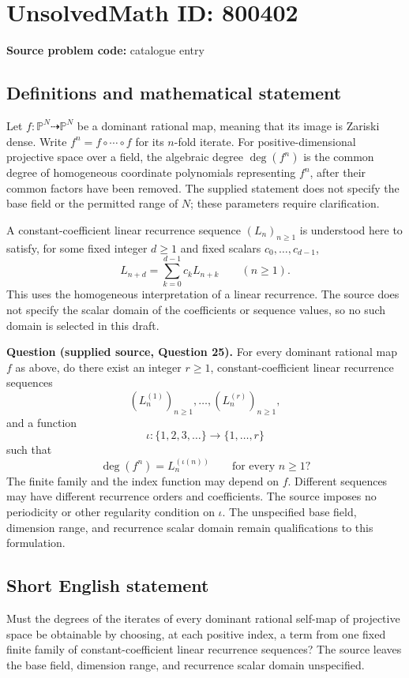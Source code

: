 \documentclass[11pt]{article}
\begin{document}
\section*{UnsolvedMath ID: 800402}
\textbf{Source problem code:} catalogue entry
\subsection{Definitions and mathematical statement}
Let \(f:\mathbb{P}^{N}\dashrightarrow\mathbb{P}^{N}\) be a dominant rational map, meaning that its image is Zariski dense. Write \(f^{n}=f\circ\cdots\circ f\) for its \(n\)-fold iterate. For positive-dimensional projective space over a field, the algebraic degree \(\deg(f^{n})\) is the common degree of homogeneous coordinate polynomials representing \(f^{n}\), after their common factors have been removed. The supplied statement does not specify the base field or the permitted range of \(N\); these parameters require clarification.

A constant-coefficient linear recurrence sequence \((L_n)_{n\geq 1}\) is understood here to satisfy, for some fixed integer \(d\geq 1\) and fixed scalars \(c_0,\ldots,c_{d-1}\),
\[
L_{n+d}=\sum_{k=0}^{d-1}c_kL_{n+k}\qquad(n\geq 1).
\]
This uses the homogeneous interpretation of a linear recurrence. The source does not specify the scalar domain of the coefficients or sequence values, so no such domain is selected in this draft.

\textbf{Question (supplied source, Question 25).} For every dominant rational map \(f\) as above, do there exist an integer \(r\geq 1\), constant-coefficient linear recurrence sequences
\[
(L_n^{(1)})_{n\geq 1},\ldots,(L_n^{(r)})_{n\geq 1},
\]
and a function
\[
\iota:\{1,2,3,\ldots\}\longrightarrow\{1,\ldots,r\}
\]
such that
\[
\deg(f^{n})=L_n^{(\iota(n))}\qquad\text{for every }n\geq 1?
\]
The finite family and the index function may depend on \(f\). Different sequences may have different recurrence orders and coefficients. The source imposes no periodicity or other regularity condition on \(\iota\). The unspecified base field, dimension range, and recurrence scalar domain remain qualifications to this formulation.
\subsection{Short English statement}
Must the degrees of the iterates of every dominant rational self-map of projective space be obtainable by choosing, at each positive index, a term from one fixed finite family of constant-coefficient linear recurrence sequences? The source leaves the base field, dimension range, and recurrence scalar domain unspecified.
\end{document}
